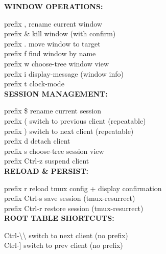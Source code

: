 \documentclass[11pt,a4paper,twoside]{book}
\begin{document}
\vspace{12pt}
{\bfseries\color{neonyellow} WINDOW OPERATIONS:}\vspace{4pt}

prefix ,              rename current window\\
prefix \&              kill window (with confirm)\\
prefix .              move window to target\\
prefix f              find window by name\\
prefix w              choose-tree window view\\
prefix i              display-message (window info)\\
prefix t              clock-mode\\


\vspace{12pt}
{\bfseries\color{neonyellow} SESSION MANAGEMENT:}\vspace{4pt}

prefix \$              rename current session\\
prefix (              switch to previous client (repeatable)\\
prefix )              switch to next client (repeatable)\\
prefix d              detach client\\
prefix s              choose-tree session view\\
prefix Ctrl-z         suspend client\\


\vspace{12pt}
{\bfseries\color{neonyellow} RELOAD \& PERSIST:}\vspace{4pt}

prefix r              reload tmux config + display confirmation\\
prefix Ctrl-s         save session (tmux-resurrect)\\
prefix Ctrl-r         restore session (tmux-resurrect)\\


\vspace{12pt}
{\bfseries\color{neonyellow} ROOT TABLE SHORTCUTS:}\vspace{4pt}

Ctrl-\textbackslash{}\textbackslash{}               switch to next client (no prefix)\\
Ctrl-]               switch to prev client (no prefix)\\
\end{document}
